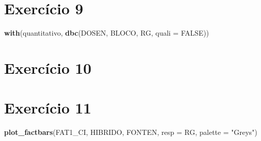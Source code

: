 \documentclass[
]{book}
\newenvironment{Shaded}{\begin{snugshade}}{\end{snugshade}}
\newcommand{\DataTypeTok}[1]{\textcolor[rgb]{0.13,0.29,0.53}{#1}}
\newcommand{\KeywordTok}[1]{\textcolor[rgb]{0.13,0.29,0.53}{\textbf{#1}}}
\newcommand{\NormalTok}[1]{#1}
\newcommand{\OperatorTok}[1]{\textcolor[rgb]{0.81,0.36,0.00}{\textbf{#1}}}
\newcommand{\OtherTok}[1]{\textcolor[rgb]{0.56,0.35,0.01}{#1}}
\newcommand{\StringTok}[1]{\textcolor[rgb]{0.31,0.60,0.02}{#1}}
\numberwithin{equation}{section}
\begin{document}
\hypertarget{exerc9}{%
\section{Exercício 9}\label{exerc9}}

\begin{Shaded}
\begin{Highlighting}[]
\KeywordTok{with}\NormalTok{(quantitativo, }\KeywordTok{dbc}\NormalTok{(DOSEN, BLOCO, RG, }\DataTypeTok{quali =} \OtherTok{FALSE}\NormalTok{))}
\end{Highlighting}
\end{Shaded}

\hypertarget{exerc10}{%
\section{Exercício 10}\label{exerc10}}

\begin{Shaded}
\end{Shaded}

\hypertarget{exerc11}{%
\section{Exercício 11}\label{exerc11}}

\begin{Shaded}
\begin{Highlighting}[]
\KeywordTok{plot\_factbars}\NormalTok{(FAT1\_CI,}
\NormalTok{              HIBRIDO,}
\NormalTok{              FONTEN,}
              \DataTypeTok{resp =}\NormalTok{ RG,}
              \DataTypeTok{palette =} \StringTok{"Greys"}\NormalTok{)}
\end{Highlighting}
\end{Shaded}
\end{document}
